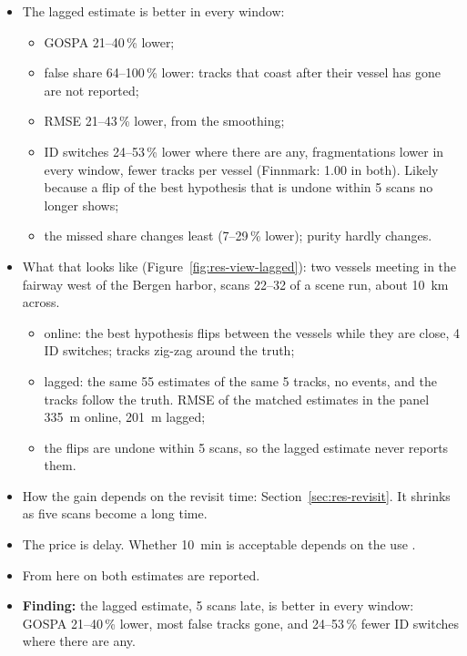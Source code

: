 \begin{itemize}
    \item The lagged estimate is better in every window:
    \begin{itemize}
        \item GOSPA 21--40\,\% lower;
        \item false share 64--100\,\% lower: tracks that coast after their vessel has gone are not reported;
        \item RMSE 21--43\,\% lower, from the smoothing;
        \item ID switches 24--53\,\% lower where there are any, fragmentations lower in every window, fewer tracks per vessel (Finnmark: 1.00 in both). Likely because a flip of the best hypothesis that is undone within 5 scans no longer shows;
        \item the missed share changes least (7--29\,\% lower); purity hardly changes.
    \end{itemize}
    \item What that looks like (Figure~\ref{fig:res-view-lagged}): two vessels meeting in the fairway west of the Bergen harbor, scans 22--32 of a scene run, about 10~km across.
    \begin{itemize}
        \item online: the best hypothesis flips between the vessels while they are close, 4 ID switches; tracks zig-zag around the truth;
        \item lagged: the same 55 estimates of the same 5 tracks, no events, and the tracks follow the truth. RMSE of the matched estimates in the panel 335~m online, 201~m lagged;
        \item the flips are undone within 5 scans, so the lagged estimate never reports them.
    \end{itemize}
    \item How the gain depends on the revisit time: Section~\ref{sec:res-revisit}. It shrinks as five scans become a long time.
    \item The price is delay. Whether 10~min is acceptable depends on the use .
    \item From here on both estimates are reported.
    \item \textbf{Finding:} the lagged estimate, 5 scans late, is better in every window: GOSPA 21--40\,\% lower, most false tracks gone, and 24--53\,\% fewer ID switches where there are any.
\end{itemize}


